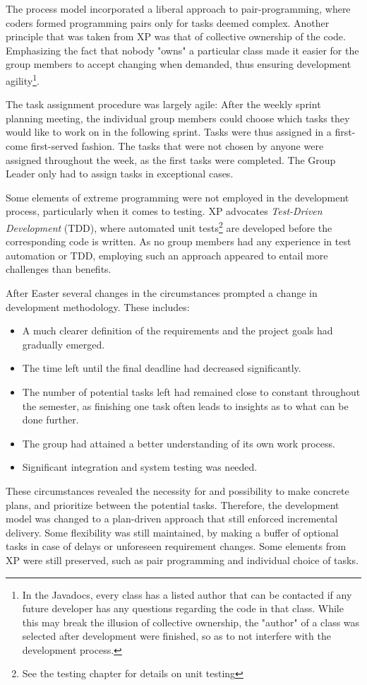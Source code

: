 The process model incorporated a liberal approach to pair-programming, where coders formed programming pairs only for tasks deemed complex. Another principle that was taken from XP was that of collective ownership of the code. Emphasizing the fact that nobody "owns" a particular class made it easier for the group members to accept changing when demanded, thus ensuring development agility\footnote{In the Javadocs, every class has a listed author that can be contacted if any future developer has any questions regarding the code in that class. While this may break the illusion of collective ownership, the "author" of a class was selected after development were finished, so as to not interfere with the development process.}.

The task assignment procedure was largely agile: After the weekly sprint planning meeting, the individual group members could choose which tasks they would like to work on in the following sprint. Tasks were thus assigned in a first-come first-served fashion. The tasks that were not chosen by anyone were assigned throughout the week, as the first tasks were completed. The Group Leader only had to assign tasks in exceptional cases.

Some elements of extreme programming were not employed in the development process, particularly when it comes to testing. XP advocates \emph{Test-Driven Development} (TDD), where automated unit tests\footnote{See the testing chapter for details on unit testing} are developed before the corresponding code is written. As no group members had any experience in test automation or TDD, employing such an approach appeared to entail more challenges than benefits. 

After Easter several changes in the circumstances prompted a change in development methodology. These includes:
\begin{itemize}
\item A much clearer definition of the requirements and the project goals had gradually emerged.
\item The time left until the final deadline had decreased significantly.
\item The number of potential tasks left had remained close to constant throughout the semester, as finishing one task often leads to insights as to what can be done further.
\item The group had attained a better understanding of its own work process. 
\item Significant integration and system testing was needed.
\end{itemize}
These circumstances revealed the necessity for and possibility to make concrete plans, and prioritize between the potential tasks. Therefore,  the development model was changed to a plan-driven approach that still enforced incremental delivery. Some flexibility was still maintained, by making a buffer of optional tasks in case of delays or unforeseen requirement changes. Some elements from XP were still preserved, such as pair programming and individual choice of tasks.

